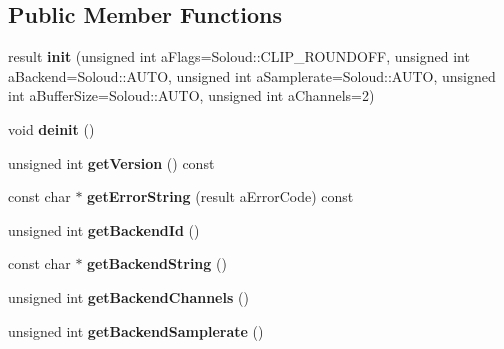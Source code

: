 \subsection*{Public Member Functions}
\begin{DoxyCompactItemize}
\item 
\mbox{\label{class_so_loud_1_1_soloud_ad0d7e608a0607aa4f82382c48210058a}} 
result {\bfseries init} (unsigned int a\+Flags=Soloud\+::\+C\+L\+I\+P\+\_\+\+R\+O\+U\+N\+D\+O\+FF, unsigned int a\+Backend=Soloud\+::\+A\+U\+TO, unsigned int a\+Samplerate=Soloud\+::\+A\+U\+TO, unsigned int a\+Buffer\+Size=Soloud\+::\+A\+U\+TO, unsigned int a\+Channels=2)
\item 
\mbox{\label{class_so_loud_1_1_soloud_a4a9787e28373943fbf75b91eeb49e39d}} 
void {\bfseries deinit} ()
\item 
\mbox{\label{class_so_loud_1_1_soloud_ad20993bd06c7bbd73cf841b322b5f4d8}} 
unsigned int {\bfseries get\+Version} () const
\item 
\mbox{\label{class_so_loud_1_1_soloud_a33c20c08430f9906dc75bedcfc9f11b9}} 
const char $\ast$ {\bfseries get\+Error\+String} (result a\+Error\+Code) const
\item 
\mbox{\label{class_so_loud_1_1_soloud_a1db83b486cbf00062b267c3cdaca6f1a}} 
unsigned int {\bfseries get\+Backend\+Id} ()
\item 
\mbox{\label{class_so_loud_1_1_soloud_a16e56871e5ce01ec8202d4a95d917513}} 
const char $\ast$ {\bfseries get\+Backend\+String} ()
\item 
\mbox{\label{class_so_loud_1_1_soloud_afe47adf7d9009bedc71265bf97e1ffd6}} 
unsigned int {\bfseries get\+Backend\+Channels} ()
\item 
\mbox{\label{class_so_loud_1_1_soloud_a1e8cd90a27fc3f1cc9e3b2fc414750fe}} 
unsigned int {\bfseries get\+Backend\+Samplerate} ()
\item 
\mbox{\label{class_so_loud_1_1_soloud_a0dcf47a9f712d0bb693cff85ca8683cd}} 

\end{DoxyCompactItemize}
